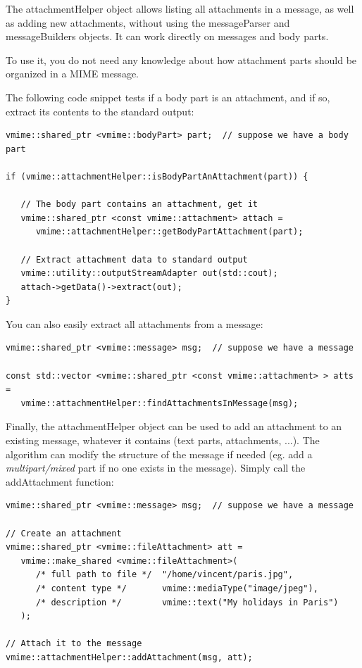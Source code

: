 The {\vcode attachmentHelper} object allows listing all attachments in a
message, as well as adding new attachments, without using the
{\vcode messageParser} and {\vcode messageBuilders} objects. It can work
directly on messages and body parts.

To use it, you do not need any knowledge about how attachment parts should
be organized in a MIME message.

The following code snippet tests if a body part is an attachment, and if so,
extract its contents to the standard output:

\begin{lstlisting}[caption={Testing if a body part is an attachment}]
vmime::shared_ptr <vmime::bodyPart> part;  // suppose we have a body part

if (vmime::attachmentHelper::isBodyPartAnAttachment(part)) {

   // The body part contains an attachment, get it
   vmime::shared_ptr <const vmime::attachment> attach =
      vmime::attachmentHelper::getBodyPartAttachment(part);

   // Extract attachment data to standard output
   vmime::utility::outputStreamAdapter out(std::cout);
   attach->getData()->extract(out);
}
\end{lstlisting}

You can also easily extract all attachments from a message:

\begin{lstlisting}[caption={Extracting all attachments from a message}]
vmime::shared_ptr <vmime::message> msg;  // suppose we have a message

const std::vector <vmime::shared_ptr <const vmime::attachment> > atts =
   vmime::attachmentHelper::findAttachmentsInMessage(msg);
\end{lstlisting}

Finally, the {\vcode attachmentHelper} object can be used to add an
attachment to an existing message, whatever it contains (text parts,
attachments, ...). The algorithm can modify the structure of the
message if needed (eg. add a \emph{multipart/mixed} part if no one
exists in the message). Simply call the {\vcode addAttachment}
function:

\begin{lstlisting}[caption={Adding an attachment to an existing message}]
vmime::shared_ptr <vmime::message> msg;  // suppose we have a message

// Create an attachment
vmime::shared_ptr <vmime::fileAttachment> att =
   vmime::make_shared <vmime::fileAttachment>(
      /* full path to file */  "/home/vincent/paris.jpg",
      /* content type */       vmime::mediaType("image/jpeg"),
      /* description */        vmime::text("My holidays in Paris")
   );

// Attach it to the message
vmime::attachmentHelper::addAttachment(msg, att);
\end{lstlisting}

